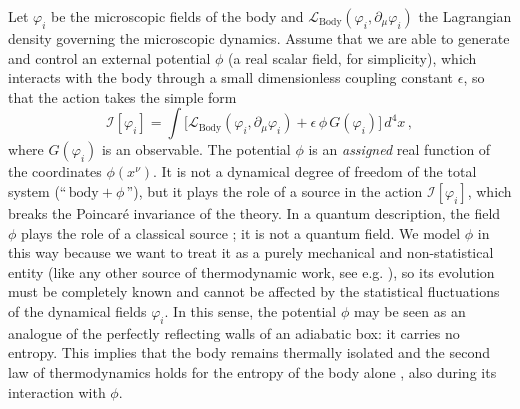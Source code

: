 \documentclass[twocolumn,usenatbib]{mnras2}
\begin{document}
Let $\varphi_i$ be the microscopic fields of the body and $\mathcal{L}_{\text{Body}}(\varphi_i,\partial_\mu \varphi_i)$ the Lagrangian density governing the microscopic dynamics. Assume that we are able to generate and control an external potential $\phi$ (a real scalar field, for simplicity), which interacts with the body through a small dimensionless coupling constant $\epsilon$, so that the action takes the simple form 
\begin{equation}\label{Action}
\mathcal{I}[\varphi_i] = \int \bigg[ \mathcal{L}_{\text{Body}}(\varphi_i,\partial_\mu \varphi_i) + \epsilon \, \phi \, G(\varphi_i) \bigg] \, d^4 x \, ,
\end{equation}
where $G(\varphi_i)$ is an observable. The potential $\phi$ is an \textit{assigned} real function of the coordinates $\phi(x^\nu)$. It is not a dynamical degree of freedom of the total system (``$\, \text{body}+\phi \,$''), but it plays the role of a source in the action $\mathcal{I}[\varphi_i]$, which breaks the Poincar\'e invariance of the theory. In a quantum description, the field $\phi$ plays the role of a classical source \citep{Peskin_book}; it is not a quantum field. We model $\phi$ in this way because we want to treat it as a purely mechanical and non-statistical entity (like any other source of thermodynamic work, see e.g. \citealt{GavassinoTermometri}), so its evolution must be completely known and cannot be affected by the statistical fluctuations of the dynamical fields $\varphi_i$. In this sense, the potential $\phi$ may be seen as an analogue of the perfectly reflecting walls of an adiabatic box: it carries no entropy. This implies that the body remains thermally isolated \citep{landau5} and the second law of thermodynamics holds for the entropy of the body alone \citep{Jaynes1965}, also during its interaction with $\phi$.
\end{document}
